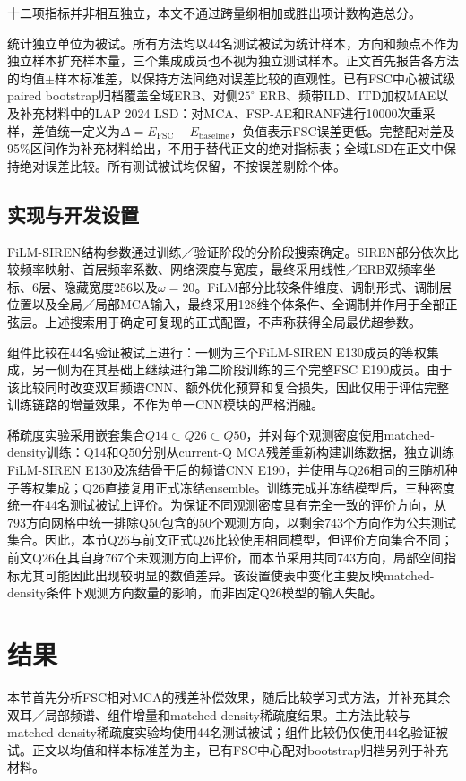 \documentclass[UTF8,a4paper]{article}
\begin{document}
十二项指标并非相互独立，本文不通过跨量纲相加或胜出项计数构造总分。

统计独立单位为被试。所有方法均以44名测试被试为统计样本，方向和频点不作为独立样本扩充样本量，三个集成成员也不视为独立测试样本。正文首先报告各方法的均值$\pm$样本标准差，以保持方法间绝对误差比较的直观性。已有FSC中心被试级paired bootstrap归档覆盖全域ERB、对侧$25^\circ$ ERB、频带ILD、ITD加权MAE以及补充材料中的LAP 2024 LSD：对MCA、FSP-AE和RANF进行10000次重采样，差值统一定义为$\Delta=E_{\mathrm{FSC}}-E_{\mathrm{baseline}}$，负值表示FSC误差更低。完整配对差及95\%区间作为补充材料给出，不用于替代正文的绝对指标表；全域LSD在正文中保持绝对误差比较。所有测试被试均保留，不按误差剔除个体。

\subsection{实现与开发设置}
FiLM-SIREN结构参数通过训练／验证阶段的分阶段搜索确定。SIREN部分依次比较频率映射、首层频率系数、网络深度与宽度，最终采用线性／ERB双频率坐标、6层、隐藏宽度256以及$\omega=20$。FiLM部分比较条件维度、调制形式、调制层位置以及全局／局部MCA输入，最终采用128维个体条件、全调制并作用于全部正弦层。上述搜索用于确定可复现的正式配置，不声称获得全局最优超参数。

组件比较在44名验证被试上进行：一侧为三个FiLM-SIREN E130成员的等权集成，另一侧为在其基础上继续进行第二阶段训练的三个完整FSC E190成员。由于该比较同时改变双耳频谱CNN、额外优化预算和复合损失，因此仅用于评估完整训练链路的增量效果，不作为单一CNN模块的严格消融。

稀疏度实验采用嵌套集合$Q14\subset Q26\subset Q50$，并对每个观测密度使用matched-density训练：Q14和Q50分别从current-Q MCA残差重新构建训练数据，独立训练FiLM-SIREN E130及冻结骨干后的频谱CNN E190，并使用与Q26相同的三随机种子等权集成；Q26直接复用正式冻结ensemble。训练完成并冻结模型后，三种密度统一在44名测试被试上评价。为保证不同观测密度具有完全一致的评价方向，从793方向网格中统一排除Q50包含的50个观测方向，以剩余743个方向作为公共测试集合。因此，本节Q26与前文正式Q26比较使用相同模型，但评价方向集合不同；前文Q26在其自身767个未观测方向上评价，而本节采用共同743方向，局部空间指标尤其可能因此出现较明显的数值差异。该设置使表中变化主要反映matched-density条件下观测方向数量的影响，而非固定Q26模型的输入失配。

\section{结果}
\label{sec:results}

本节首先分析FSC相对MCA的残差补偿效果，随后比较学习式方法，并补充其余双耳／局部频谱、组件增量和matched-density稀疏度结果。主方法比较与matched-density稀疏度实验均使用44名测试被试；组件比较仍仅使用44名验证被试。正文以均值和样本标准差为主，已有FSC中心配对bootstrap归档另列于补充材料。
\end{document}
